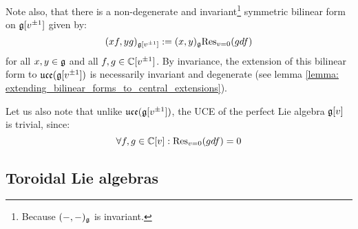 \begin{example}
            Note also, that there is a non-degenerate and invariant\footnote{Because $(-, -)_{\mathfrak{g}}$ is invariant.} symmetric bilinear form on $\mathfrak{g}[v^{\pm 1}]$ given by:
                $$(xf, yg)_{\mathfrak{g}[v^{\pm 1}]} := (x, y)_{\mathfrak{g}} \mathrm{Res}_{v = 0}(g df)$$
            for all $x, y \in \mathfrak{g}$ and all $f, g \in \mathbb{C}[v^{\pm 1}]$. By invariance, the extension of this bilinear form to $\mathfrak{uce}(\mathfrak{g}[v^{\pm 1}])$ is necessarily invariant and degenerate (see lemma \ref{lemma: extending_bilinear_forms_to_central_extensions}).

            Let us also note that unlike $\mathfrak{uce}(\mathfrak{g}[v^{\pm 1}])$, the UCE of the perfect Lie algebra $\mathfrak{g}[v]$ is trivial, since:
                $$\forall f, g \in \mathbb{C}[v]: \mathrm{Res}_{v = 0}(g df) = 0$$
        \end{example}

    \subsection{Toroidal Lie algebras}
